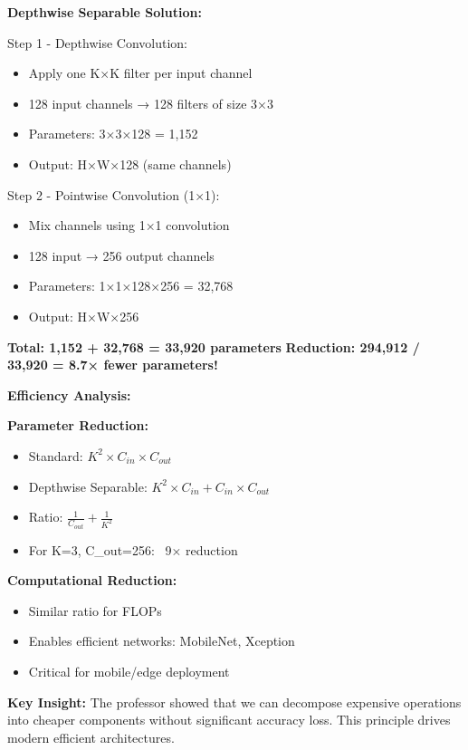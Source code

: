 \documentclass[12pt]{article}
\newcommand{\explanation}[1]{{\color{explanationcolor}#1}}
\begin{document}
\begin{enumerate}[(a)]
{{    \textbf{Depthwise Separable Solution:}
    
    Step 1 - Depthwise Convolution:
    \begin{itemize}
        \item Apply one K×K filter per input channel
        \item 128 input channels → 128 filters of size 3×3
        \item Parameters: 3×3×128 = 1,152
        \item Output: H×W×128 (same channels)
    \end{itemize}
    
    Step 2 - Pointwise Convolution (1×1):
    \begin{itemize}
        \item Mix channels using 1×1 convolution
        \item 128 input → 256 output channels
        \item Parameters: 1×1×128×256 = 32,768
        \item Output: H×W×256
    \end{itemize}
    
    \textbf{Total: 1,152 + 32,768 = 33,920 parameters}
    \textbf{Reduction: 294,912 / 33,920 = 8.7× fewer parameters!}
    }
    
    \textbf{Efficiency Analysis:}
    
    \explanation{
    \textbf{Parameter Reduction:}
    \begin{itemize}
        \item Standard: $K^2 \times C_{in} \times C_{out}$
        \item Depthwise Separable: $K^2 \times C_{in} + C_{in} \times C_{out}$
        \item Ratio: $\frac{1}{C_{out}} + \frac{1}{K^2}$
        \item For K=3, C_out=256: ~9× reduction
    \end{itemize}
    
    \textbf{Computational Reduction:}
    \begin{itemize}
        \item Similar ratio for FLOPs
        \item Enables efficient networks: MobileNet, Xception
        \item Critical for mobile/edge deployment
    \end{itemize}
    
    \textbf{Key Insight:}
    The professor showed that we can decompose expensive operations into cheaper components without significant accuracy loss. This principle drives modern efficient architectures.
    }
    }
    

\end{enumerate}
\end{document}
